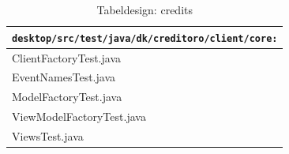 \begin{table}[H]
    \begin{tabularx}{\textwidth}{|>{\RaggedRight}X|}
        \hline
        \texttt{\textbf{desktop/src/test/java/dk/creditoro/client/core:}} \\
        \hline
            ClientFactoryTest.java\\
            EventNamesTest.java\\
            ModelFactoryTest.java\\
            ViewModelFactoryTest.java\\
            ViewsTest.java\\
        \hline
    \end{tabularx}
    \caption{Tabeldesign: credits}
    \label{tab:oversigt}
\end{table}